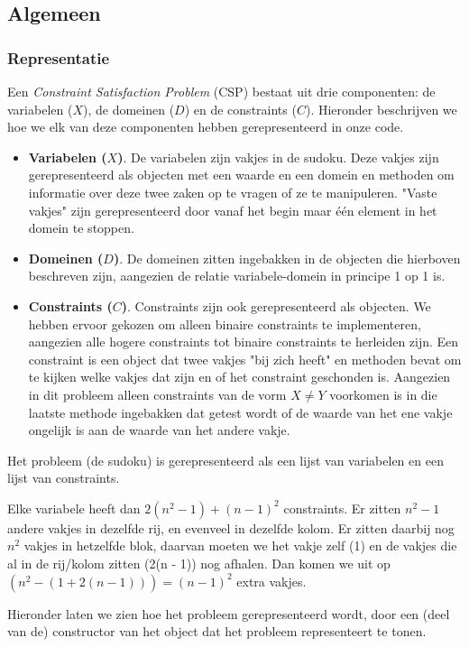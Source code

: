 \documentclass[]{report}
\begin{document}
\subsection{Algemeen}
\subsubsection{Representatie}
Een \textit{Constraint Satisfaction Problem} (CSP) bestaat uit drie componenten: de variabelen ($X$), de domeinen ($D$) en de constraints ($C$). Hieronder beschrijven we hoe we elk van deze componenten hebben gerepresenteerd in onze code.
\begin{itemize}
\item \textbf{Variabelen ($X$)}. De variabelen zijn vakjes in de sudoku. Deze vakjes zijn gerepresenteerd als objecten met een waarde en een domein en methoden om informatie over deze twee zaken op te vragen of ze te manipuleren. "Vaste vakjes" zijn gerepresenteerd door vanaf het begin maar één element in het domein te stoppen.
\item \textbf{Domeinen ($D$)}. De domeinen zitten ingebakken in de objecten die hierboven beschreven zijn, aangezien de relatie variabele-domein in principe 1 op 1 is.
\item \textbf{Constraints ($C$)}. Constraints zijn ook gerepresenteerd als objecten. We hebben ervoor gekozen om alleen binaire constraints te implementeren, aangezien alle hogere constraints tot binaire constraints te herleiden zijn. Een constraint is een object dat twee vakjes "bij zich heeft" en methoden bevat om te kijken welke vakjes dat zijn en of het constraint geschonden is. Aangezien in dit probleem alleen constraints van de vorm $ X \not= Y $ voorkomen is in die laatste methode ingebakken dat getest wordt of de waarde van het ene vakje ongelijk is aan de waarde van het andere vakje.
\end{itemize}
Het probleem (de sudoku) is gerepresenteerd als een lijst van variabelen en een lijst van constraints.

Elke variabele heeft dan $2(n^2 - 1) + (n - 1)^2$ constraints. Er zitten $n^2 - 1$ andere vakjes in dezelfde rij, en evenveel in dezelfde kolom. Er zitten daarbij nog $n^2$ vakjes in hetzelfde blok, daarvan moeten we  het vakje zelf (1) en de vakjes die al in de rij/kolom zitten (2(n - 1)) nog afhalen. Dan komen we uit op $(n^2 - (1 + 2(n - 1))) = (n - 1)^2$ extra vakjes.

Hieronder laten we zien hoe het probleem gerepresenteerd wordt, door een (deel van de) constructor van het object dat het probleem representeert te tonen.
\end{document}

